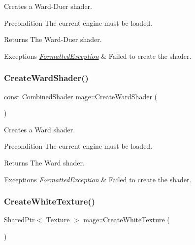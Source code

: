 Creates a Ward-\/\+Duer shader.

\begin{DoxyPrecond}{Precondition}
The current engine must be loaded. 
\end{DoxyPrecond}
\begin{DoxyReturn}{Returns}
The Ward-\/\+Duer shader. 
\end{DoxyReturn}

\begin{DoxyExceptions}{Exceptions}
{\em \hyperlink{structmage_1_1_formatted_exception}{Formatted\+Exception}} & Failed to create the shader. \\
\hline
\end{DoxyExceptions}
\hypertarget{namespacemage_a834147c12fe0b58faf982c6effad5dc5}{}\label{namespacemage_a834147c12fe0b58faf982c6effad5dc5} 
\subsubsection{\texorpdfstring{Create\+Ward\+Shader()}{CreateWardShader()}}
{\footnotesize\ttfamily const \hyperlink{structmage_1_1_combined_shader}{Combined\+Shader} mage\+::\+Create\+Ward\+Shader (\begin{DoxyParamCaption}{ }\end{DoxyParamCaption})}

Creates a Ward shader.

\begin{DoxyPrecond}{Precondition}
The current engine must be loaded. 
\end{DoxyPrecond}
\begin{DoxyReturn}{Returns}
The Ward shader. 
\end{DoxyReturn}

\begin{DoxyExceptions}{Exceptions}
{\em \hyperlink{structmage_1_1_formatted_exception}{Formatted\+Exception}} & Failed to create the shader. \\
\hline
\end{DoxyExceptions}
\hypertarget{namespacemage_ac3a2a10cbfc0346662a6fb40dcd0c400}{}\label{namespacemage_ac3a2a10cbfc0346662a6fb40dcd0c400} 
\subsubsection{\texorpdfstring{Create\+White\+Texture()}{CreateWhiteTexture()}}
{\footnotesize\ttfamily \hyperlink{namespacemage_a1e01ae66713838a7a67d30e44c67703e}{Shared\+Ptr}$<$ \hyperlink{classmage_1_1_texture}{Texture} $>$ mage\+::\+Create\+White\+Texture (\begin{DoxyParamCaption}{ }\end{DoxyParamCaption})}

